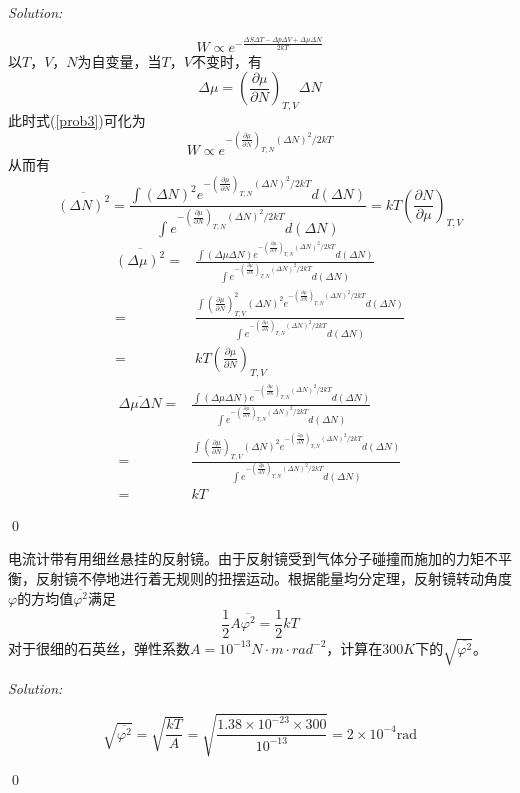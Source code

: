 \documentclass[12pt,a4paper]{article}
\newenvironment{problem}[2][Problem]{\begin{trivlist}
\item[\hskip \labelsep {\bfseries #1}\hskip \labelsep {\bfseries #2.}]}{\end{trivlist}}
\newenvironment{sol}
    {\emph{Solution:}
    }
    {
    \qed
    }
\begin{document}
\begin{sol}
\begin{equation}
\label{prob3}
W\propto e^{-\frac{\Delta S\Delta T-\Delta p\Delta V+\Delta\mu\Delta N}{2kT}}
\end{equation}
以$T$，$V$，$N$为自变量，当$T$，$V$不变时，有
\begin{equation}
\Delta\mu=\left(\frac{\partial\mu}{\partial N}\right)_{T,V}\Delta N
\end{equation}
此时式(\ref{prob3})可化为
\begin{equation}
W\propto e^{-\left(\frac{\partial\mu}{\partial N}\right)_{T,N}(\Delta N)^2/2kT}
\end{equation}
从而有
\begin{equation}
\overline{(\Delta N)^2}=\frac{\int(\Delta N)^2e^{-\left(\frac{\partial\mu}{\partial N}\right)_{T,N}(\Delta N)^2/2kT}d(\Delta N)}{\int e^{-\left(\frac{\partial\mu}{\partial N}\right)_{T,N}(\Delta N)^2/2kT}d(\Delta N)}=kT\left(\frac{\partial N}{\partial\mu}\right)_{T,V}
\end{equation}
\begin{align}
\nonumber\overline{(\Delta\mu)^2}=&\frac{\int(\Delta\mu\Delta N)e^{-\left(\frac{\partial\mu}{\partial N}\right)_{T,N}(\Delta N)^2/2kT}d(\Delta N)}{\int e^{-\left(\frac{\partial\mu}{\partial N}\right)_{T,N}(\Delta N)^2/2kT}d(\Delta N)}\\
\nonumber=&\frac{\int\left(\frac{\partial\mu}{\partial N}\right)_{T,V}^2(\Delta N)^2e^{-\left(\frac{\partial\mu}{\partial N}\right)_{T,N}(\Delta N)^2/2kT}d(\Delta N)}{\int e^{-\left(\frac{\partial\mu}{\partial N}\right)_{T,N}(\Delta N)^2/2kT}d(\Delta N)}\\
=&kT\left(\frac{\partial\mu}{\partial N}\right)_{T,V}
\end{align}
\begin{align}
\nonumber\overline{\Delta\mu\Delta N}=&\frac{\int(\Delta\mu\Delta N)e^{-\left(\frac{\partial\mu}{\partial N}\right)_{T,N}(\Delta N)^2/2kT}d(\Delta N)}{\int e^{-\left(\frac{\partial\mu}{\partial N}\right)_{T,N}(\Delta N)^2/2kT}d(\Delta N)}\\
\nonumber=&\frac{\int\left(\frac{\partial\mu}{\partial N}\right)_{T,V}(\Delta N)^2e^{-\left(\frac{\partial\mu}{\partial N}\right)_{T,N}(\Delta N)^2/2kT}d(\Delta N)}{\int e^{-\left(\frac{\partial\mu}{\partial N}\right)_{T,N}(\Delta N)^2/2kT}d(\Delta N)}\\
=&kT
\end{align}
\end{sol}

\begin{problem}{10.7}
电流计带有用细丝悬挂的反射镜。由于反射镜受到气体分子碰撞而施加的力矩不平衡，反射镜不停地进行着无规则的扭摆运动。根据能量均分定理，反射镜转动角度$\varphi$的方均值$\overline{\varphi^2}$满足
\[
\frac{1}{2}A\overline{\varphi^2}=\frac{1}{2}kT
\]
对于很细的石英丝，弹性系数$A=10^{-13}N\cdot m\cdot rad^{-2}$，计算在$300K$下的$\sqrt{\overline{\varphi^2}}$。
\end{problem}
\begin{sol}
\begin{equation}
\sqrt{\overline{\varphi^2}}=\sqrt{\frac{kT}{A}}=\sqrt{\frac{1.38\times10^{-23}\times300}{10^{-13}}}=2\times10^{-4}\text{rad}
\end{equation}
\end{sol}
\end{document}
